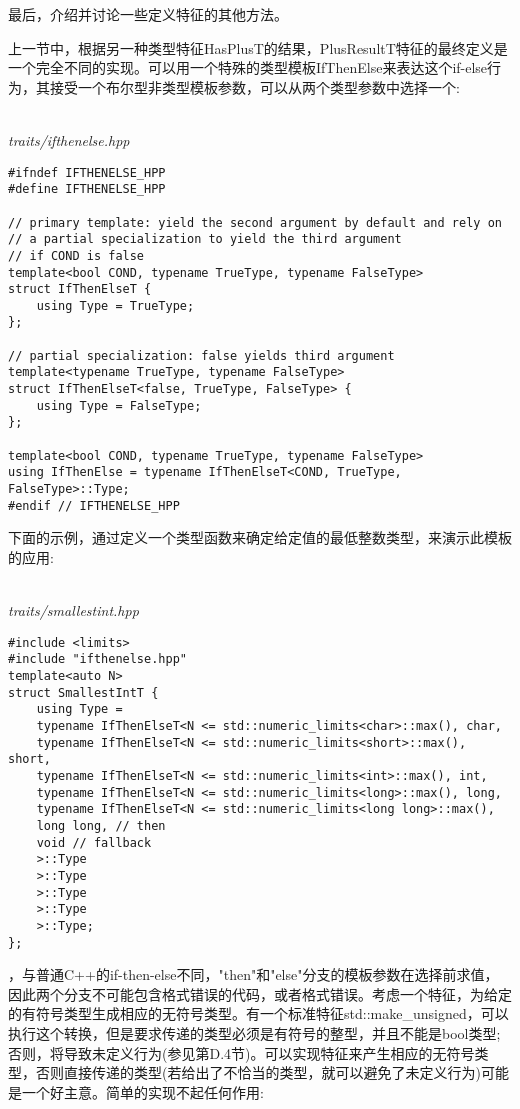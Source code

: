 
最后，介绍并讨论一些定义特征的其他方法。


上一节中，根据另一种类型特征HasPlusT的结果，PlusResultT特征的最终定义是一个完全不同的实现。可以用一个特殊的类型模板IfThenElse来表达这个if-else行为，其接受一个布尔型非类型模板参数，可以从两个类型参数中选择一个:

\hspace*{\fill} \\ %
\noindent
\textit{traits/ifthenelse.hpp}
\begin{lstlisting}[style=styleCXX]
#ifndef IFTHENELSE_HPP
#define IFTHENELSE_HPP

// primary template: yield the second argument by default and rely on
// a partial specialization to yield the third argument
// if COND is false
template<bool COND, typename TrueType, typename FalseType>
struct IfThenElseT {
	using Type = TrueType;
};

// partial specialization: false yields third argument
template<typename TrueType, typename FalseType>
struct IfThenElseT<false, TrueType, FalseType> {
	using Type = FalseType;
};

template<bool COND, typename TrueType, typename FalseType>
using IfThenElse = typename IfThenElseT<COND, TrueType, FalseType>::Type;
#endif // IFTHENELSE_HPP
\end{lstlisting}

下面的示例，通过定义一个类型函数来确定给定值的最低整数类型，来演示此模板的应用:

\hspace*{\fill} \\ %
\noindent
\textit{traits/smallestint.hpp}
\begin{lstlisting}[style=styleCXX]
#include <limits>
#include "ifthenelse.hpp"
template<auto N>
struct SmallestIntT {
	using Type =
	typename IfThenElseT<N <= std::numeric_limits<char>::max(), char,
	typename IfThenElseT<N <= std::numeric_limits<short>::max(), short,
	typename IfThenElseT<N <= std::numeric_limits<int>::max(), int,
	typename IfThenElseT<N <= std::numeric_limits<long>::max(), long,
	typename IfThenElseT<N <= std::numeric_limits<long long>::max(),
	long long, // then
	void // fallback
	>::Type
	>::Type
	>::Type
	>::Type
	>::Type;
};
\end{lstlisting}

，与普通C++的if-then-else不同，"then"和"else"分支的模板参数在选择前求值，因此两个分支不可能包含格式错误的代码，或者格式错误。考虑一个特征，为给定的有符号类型生成相应的无符号类型。有一个标准特征std::make\_unsigned，可以执行这个转换，但是要求传递的类型必须是有符号的整型，并且不能是bool类型;否则，将导致未定义行为(参见第D.4节)。可以实现特征来产生相应的无符号类型，否则直接传递的类型(若给出了不恰当的类型，就可以避免了未定义行为)可能是一个好主意。简单的实现不起任何作用:

